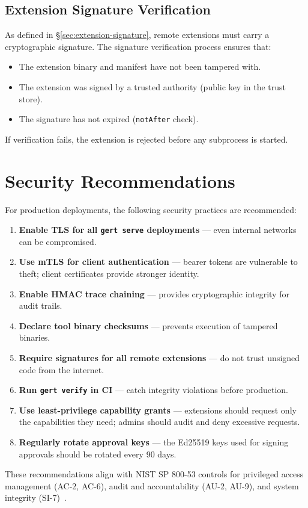 \subsection{Extension Signature Verification}

As defined in §\ref{sec:extension-signature}, remote extensions must carry a
cryptographic signature.  The signature verification process ensures that:

\begin{itemize}
  \item The extension binary and manifest have not been tampered with.
  \item The extension was signed by a trusted authority (public key in the
        trust store).
  \item The signature has not expired (\texttt{notAfter} check).
\end{itemize}

If verification fails, the extension is rejected before any subprocess is
started.

\section{Security Recommendations}

For production deployments, the following security practices are recommended:

\begin{enumerate}
  \item \textbf{Enable TLS for all \texttt{gert serve} deployments} — even
        internal networks can be compromised.
  \item \textbf{Use mTLS for client authentication} — bearer tokens are
        vulnerable to theft; client certificates provide stronger identity.
  \item \textbf{Enable HMAC trace chaining} — provides cryptographic integrity
        for audit trails.
  \item \textbf{Declare tool binary checksums} — prevents execution of
        tampered binaries.
  \item \textbf{Require signatures for all remote extensions} — do not trust
        unsigned code from the internet.
  \item \textbf{Run \texttt{gert verify} in CI} — catch integrity violations
        before production.
  \item \textbf{Use least-privilege capability grants} — extensions should
        request only the capabilities they need; admins should audit and deny
        excessive requests.
  \item \textbf{Regularly rotate approval keys} — the Ed25519 keys used for
        signing approvals should be rotated every 90 days.
\end{enumerate}

These recommendations align with NIST SP 800-53 controls for privileged access
management (AC-2, AC-6), audit and accountability (AU-2, AU-9), and system
integrity (SI-7)~\cite{nist-sp800-53}.
